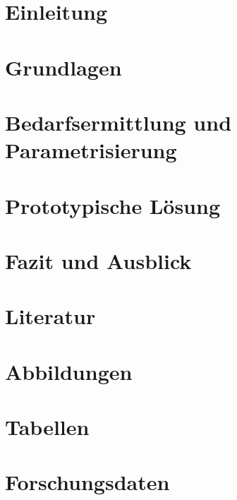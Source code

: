 \documentclass[headings=small,a4paper,12pt,oneside]{scrreprt}
\begin{document}
\singlespacing

\maketitle

\singlespacing
\tableofcontents
\restoregeometry

\singlespacing
\chapter{Einleitung}


\singlespacing 
\chapter{Grundlagen}


\singlespacing
\chapter{Bedarfsermittlung und Parametrisierung}


\singlespacing 
\chapter{Prototypische Lösung}


\singlespacing 
\chapter{Fazit und Ausblick}


\singlespacing 
\appendix
\chapter{Literatur}

\chapter{Abbildungen}
\chapter{Tabellen}

\chapter{Forschungsdaten}

\end{document}
